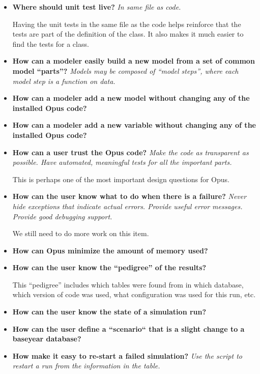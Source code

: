 \begin{itemize}
  \item {\bf Where should unit test live?} \emph{In same file as code.}

  Having the unit tests in the same file as the code helps reinforce that the
  tests are part of the definition of the class.  It also makes it much easier
  to find the tests for a class.

  \item {\bf How can a modeler easily build a new model from a set of common
  model ``parts''?} \emph{Models may be composed of ``model steps'', where each
  model step is a function on data.}

  \item {\bf How can a modeler add a new model without changing any of the
  installed Opus code?}

  \item {\bf How can a modeler add a new variable without changing any of the
  installed Opus code?}

  \item {\bf How can a user trust the Opus code?} \emph{Make the code as
  transparent as possible.  Have automated, meaningful tests for all the
  important parts.}

  This is perhaps one of the most important design questions for Opus.

  \item {\bf How can the user know what to do when there is a failure?}
  \emph{Never hide exceptions that indicate actual errors.  Provide useful
  error messages.  Provide good debugging support.}

  We still need to do more work on this item.

  \item {\bf How can Opus minimize the amount of memory used?}

  \item {\bf How can the user know the ``pedigree'' of the results?}

  This ``pedigree'' includes which tables were found from in which database,
  which version of code was used, what configuration was used for this run, etc.

  \item {\bf How can the user know the state of a simulation run?}

  \item {\bf How can the user define a ``scenario`` that is a slight change to
  a baseyear database?}

  \item {\bf How make it easy to re-start a failed simulation?} \emph{Use the
   script to restart a run from the
  information in the  table.}


\end{itemize}
